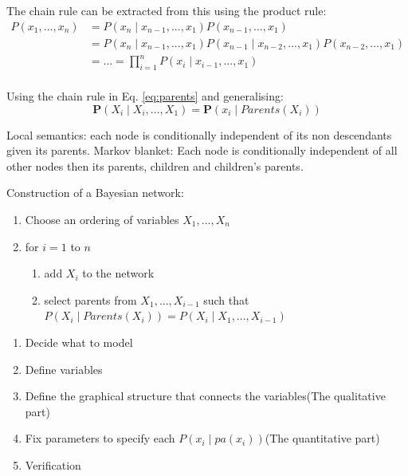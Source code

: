\documentclass[11pt, letterpaper]{report}
\numberwithin{equation}{section}
\begin{document}
The chain rule can be extracted from this using the product rule:
\begin{equation}
  \begin{split}
    \label{eq:chainrule}
    P(x_1,...,x_n) &= P(x_n \mid x_{n-1},...,x_1)P(x_{n-1},...,x_1) \\
      &= P(x_n \mid x_{n-1},...,x_1)P(x_{n-1} \mid x_{n-2},...,x_1)P(x_{n-2},...,x_1) \\
      &= ... = \prod_{i=1}^n P(x_i \mid x_{i-1},...,x_1) \\
  \end{split}
\end{equation}

Using the chain rule in Eq. \ref{eq:parents} and generalising:
\begin{equation}
  \label{eq:parentsgen}
  \boldsymbol{P}(X_i \mid X_i,...,X_1) = \boldsymbol{P}(x_i \mid Parents(X_i))
\end{equation}

Local semantics: each node is conditionally independent of its non descendants
given its parents.
Markov blanket: Each node is conditionally independent of all other nodes then its
parents, children and children's parents.

Construction of a Bayesian network:
\begin{enumerate}
  \item Choose an ordering of variables $X_1,...,X_n$
  \item for $i = 1$ to $n$
    \begin{enumerate}
      \item add $X_i$ to the network
      \item select parents from $X_1,...,X_{i-1}$ such that $P(X_i \mid
        Parents(X_i)) = P(X_i \mid X_1,...,X_{i-1})$
    \end{enumerate}
\end{enumerate}

\begin{enumerate}[label=Step \arabic* - ]
  \item Decide what to model
  \item Define variables
  \item Define the graphical structure that connects the variables(The
    qualitative part)
  \item Fix parameters to specify each $P(x_i \mid pa(x_i))$(The quantitative
    part)
  \item Verification
\end{enumerate}
\end{document}
